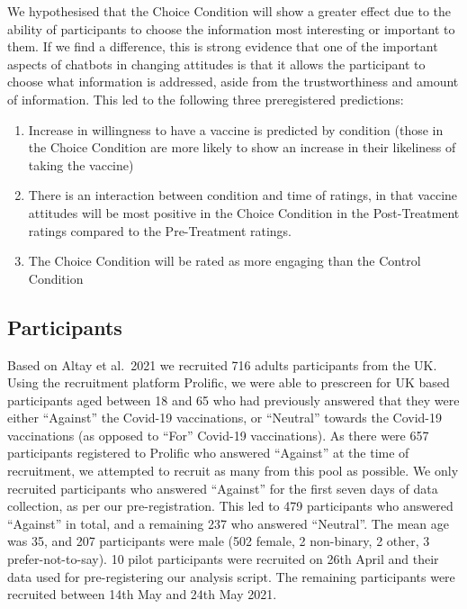 \documentclass[
  english,
  ,jou,floatsintext]{apa6}
\providecommand{\tightlist}{%
  \setlength{\itemsep}{0pt}\setlength{\parskip}{0pt}}
\begin{document}
We hypothesised that the Choice Condition will show a greater effect due to the ability of participants to choose the information most interesting or important to them. If we find a difference, this is strong evidence that one of the important aspects of chatbots in changing attitudes is that it allows the participant to choose what information is addressed, aside from the trustworthiness and amount of information. This led to the following three preregistered predictions:

\begin{enumerate}
\def\labelenumi{\arabic{enumi})}
\tightlist
\item
  Increase in willingness to have a vaccine is predicted by condition (those in the Choice Condition are more likely to show an increase in their likeliness of taking the vaccine)
\item
  There is an interaction between condition and time of ratings, in that vaccine attitudes will be most positive in the Choice Condition in the Post-Treatment ratings compared to the Pre-Treatment ratings.
\item
  The Choice Condition will be rated as more engaging than the Control Condition
\end{enumerate}

\hypertarget{participants}{%
\subsection{Participants}\label{participants}}

Based on Altay et al.~2021 we recruited 716 adults participants from the UK. Using the recruitment platform Prolific, we were able to prescreen for UK based participants aged between 18 and 65 who had previously answered that they were either ``Against'' the Covid-19 vaccinations, or ``Neutral'' towards the Covid-19 vaccinations (as opposed to ``For'' Covid-19 vaccinations). As there were 657 participants registered to Prolific who answered ``Against'' at the time of recruitment, we attempted to recruit as many from this pool as possible. We only recruited participants who answered ``Against'' for the first seven days of data collection, as per our pre-registration. This led to 479 participants who answered ``Against'' in total, and a remaining 237 who answered ``Neutral''. The mean age was 35, and 207 participants were male (502 female, 2 non-binary, 2 other, 3 prefer-not-to-say). 10 pilot participants were recruited on 26th April and their data used for pre-registering our analysis script. The remaining participants were recruited between 14th May and 24th May 2021.
\end{document}
